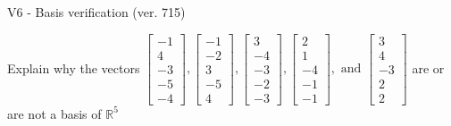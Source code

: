 \begin{exercise}
  \begin{exerciseTitle}V6 - Basis verification (ver. 715)\end{exerciseTitle}
  \begin{exerciseStatement}
    Explain why the vectors \(\left[\begin{array}{r}
-1 \\
4 \\
-3 \\
-5 \\
-4
\end{array}\right] , \left[\begin{array}{r}
-1 \\
-2 \\
3 \\
-5 \\
4
\end{array}\right] , \left[\begin{array}{r}
3 \\
-4 \\
-3 \\
-2 \\
-3
\end{array}\right] , \left[\begin{array}{r}
2 \\
1 \\
-4 \\
-1 \\
-1
\end{array}\right] , \text{ and } \left[\begin{array}{r}
3 \\
4 \\
-3 \\
2 \\
2
\end{array}\right]\) are or are not a basis of \(\mathbb{R}^5\)	



\end{exerciseStatement}
\end{exercise}
